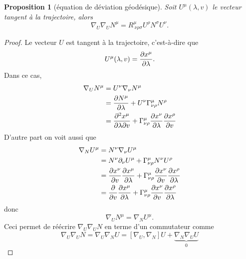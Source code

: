\documentclass[a4paper,11pt]{report}
\theoremstyle{definition}
\theoremstyle{plain}
\newtheorem{prop}[thm]{Proposition}
\theoremstyle{definition}
\theoremstyle{remark}
\newcommand{\p}{\partial}
\begin{document}
            \begin{prop}[équation de déviation géodésique]
                Soit $U^\mu(\lambda,v)$ le vecteur tangent à la trajectoire, alors
                \begin{equation}
                    \nabla_U\nabla_U N^\mu = R^\mu_{~\nu\rho\sigma}U^\rho N^\sigma U^\nu.
                \end{equation}
            \end{prop}
            
            \begin{proof}
                Le vecteur $U$ est tangent à la trajectoire, c'est-à-dire que
                \begin{equation}
                    U^\mu(\lambda,v) = \pdv{x^\mu}{\lambda}.
                \end{equation}
                Dans ce cas,
                \begin{align}
                    \nabla_U N^\mu &= U^\nu\nabla_\nu N^\mu\\
                    &= \pdv{N^\mu}{\lambda}+U^\nu\Gamma^\mu_{\nu\rho}N^\rho\\
                    &= \pdv{x^\mu}{\lambda}{v} + \Gamma^\mu_{\nu\rho}\pdv{x^\nu}{\lambda}\pdv{x^\rho}{v}
                \end{align}
                D'autre part on voit aussi que
                \begin{align}
                    \nabla_N U^\mu &= N^\nu \nabla_\nu U^\mu\\
                    &= N^\nu\p_\nu U^\mu + \Gamma^\mu_{\nu\rho} N^\nu U^\rho\\
                    &= \pdv{x^\nu}{v}\pdv{x^\mu}{\lambda} + \Gamma^\mu_{\nu\rho}\pdv{x^\nu}{v}\pdv{x^\rho}{\lambda}\\
                    &= \pdv{}{v}\pdv{x^\mu}{\lambda} + \Gamma^\mu_{\nu\rho}\pdv{x^\nu}{v}\pdv{x^\rho}{\lambda}
                \end{align}
                donc
                \begin{equation}
                    \nabla_U N^\mu = \nabla_N U^\mu.
                \end{equation}
                Ceci permet de réécrire $\nabla_U\nabla_U N$ en terme d'un commutateur comme
                \begin{equation}
                    \nabla_U\nabla_U N = \nabla_U\nabla_N U = [\nabla_U,\nabla_N]U+\underbrace{\nabla_N\nabla_U U}_{0}
                \end{equation}

\end{proof}
\end{document}
